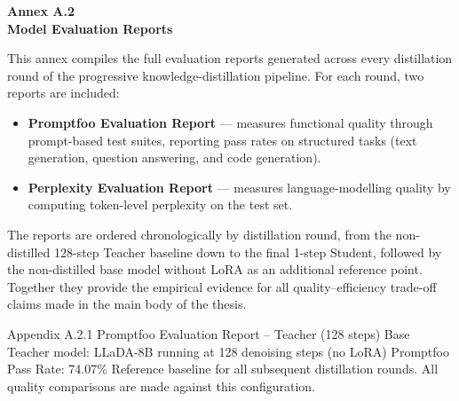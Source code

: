 \documentclass[11pt, a4paper]{article}
\begin{document}
\newpage
\thispagestyle{fancy}
\label{sec:annex_reports}
\vspace*{3cm}
\begin{center}
    {\Large\bfseries Annex A.2}\\[1.2em]
    {\large\bfseries Model Evaluation Reports}\\[2.5em]
    \begin{minipage}{0.82\textwidth}
        \normalsize
        This annex compiles the full evaluation reports generated across every distillation round of the progressive knowledge-distillation pipeline.
        For each round, two reports are included:
        \begin{itemize}
            \item \textbf{Promptfoo Evaluation Report} --- measures functional quality through prompt-based test suites, reporting pass rates on structured tasks (text generation, question answering, and code generation).
            \item \textbf{Perplexity Evaluation Report} --- measures language-modelling quality by computing token-level perplexity on the test set.
        \end{itemize}
        \vspace{0.8em}
        The reports are ordered chronologically by distillation round, from the non-distilled 128-step Teacher baseline down to the final 1-step Student, followed by the non-distilled base model without LoRA as an additional reference point.
        Together they provide the empirical evidence for all quality--efficiency trade-off claims made in the main body of the thesis.
    \end{minipage}
\end{center}
\vfill

\annexcover%
    {Appendix A.2.1}%
    {Promptfoo Evaluation Report – Teacher (128 steps)}%
    {Base Teacher model: LLaDA-8B running at 128 denoising steps (no LoRA)}%
    {Promptfoo Pass Rate: 74.07\%}%
    {Reference baseline for all subsequent distillation rounds. All quality comparisons are made against this configuration.}
\end{document}
